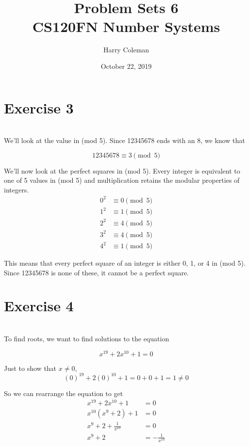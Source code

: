 \documentclass[12pt]{article}
\begin{document}
 
\title{Problem Sets 6\\
    \large CS120FN Number Systems}
\author{Harry Coleman}
\date{October 22, 2019}

\maketitle

\section*{Exercise 3}
\\

We'll look at the value in (mod 5). Since 12345678 ends with an 8, we know that

\[12345678 \equiv 3 \pmod{5}\]

We'll now look at the perfect squares in (mod 5). Every integer is equivalent to one of 5 values in (mod 5) and multiplication retains the modular properties of integers.
\begin{align*}
    0^2 &\equiv 0 \pmod{5} \\
    1^2 &\equiv 1 \pmod{5} \\
    2^2 &\equiv 4 \pmod{5} \\
    3^2 &\equiv 4 \pmod{5} \\
    4^2 &\equiv 1 \pmod{5} 
\end{align*}

This means that every perfect square of an integer is either 0, 1, or 4 in (mod 5). Since 12345678 is none of these, it cannot be a perfect square.

\newpage
\section*{Exercise 4}
\\

To find roots, we want to find solutions to the equation

\[x^{19}+2x^{10}+1 = 0\]

Just to show that $x \ne 0$,
\[(0)^{19}+2(0)^{10}+1 = 0 + 0 + 1 = 1 \ne 0\]

So we can rearrange the equation to get
\begin{align*}
    x^{19}+2x^{10}+1 &= 0 \\
    x^{10}(x^9 + 2) +1 &= 0 \\
    x^9 + 2 + \frac{1}{x^{10}} &= 0 \\
    x^9 + 2 &= -\frac{1}{x^{10}} \\
\end{align*}
\end{document}
